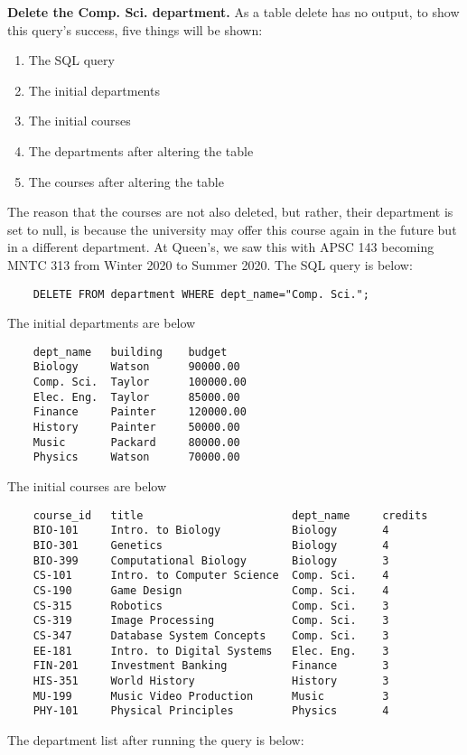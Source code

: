 \documentclass[letterpaper]{article}
\begin{document}
    \textbf{Delete the Comp. Sci. department.}
    As a table delete has no output, to show this query's success, five things will be shown:
    \begin{enumerate}
        \item The SQL query
        \item The initial departments
        \item The initial courses
        \item The departments after altering the table
        \item The courses after altering the table
    \end{enumerate}
    The reason that the courses are not also deleted, but rather, their department is set to null, is because the university may offer this course again in the future but in a different department. At Queen's, we saw this with APSC 143 becoming MNTC 313 from Winter 2020 to Summer 2020.
    The SQL query is below:
    \begin{lstlisting}
    DELETE FROM department WHERE dept_name="Comp. Sci.";
    \end{lstlisting}
    The initial departments are below
    \begin{lstlisting}
    dept_name	building	budget	
    Biology	    Watson	    90000.00
    Comp. Sci.	Taylor	    100000.00	
    Elec. Eng.	Taylor	    85000.00
    Finance	    Painter	    120000.00
    History	    Painter	    50000.00
    Music	    Packard	    80000.00
    Physics	    Watson	    70000.00
    \end{lstlisting}
    The initial courses are below
    \begin{lstlisting}
    course_id	title	                    dept_name	  credits	
    BIO-101	    Intro. to Biology	        Biology	      4
    BIO-301	    Genetics	                Biology	      4
    BIO-399	    Computational Biology	    Biology       3
    CS-101	    Intro. to Computer Science	Comp. Sci.	  4
    CS-190	    Game Design	                Comp. Sci.    4
    CS-315	    Robotics	                Comp. Sci.    3
    CS-319	    Image Processing	        Comp. Sci.    3
    CS-347	    Database System Concepts	Comp. Sci.    3
    EE-181	    Intro. to Digital Systems	Elec. Eng.    3
    FIN-201	    Investment Banking	        Finance	      3
    HIS-351	    World History	            History	      3
    MU-199	    Music Video Production	    Music	      3
    PHY-101	    Physical Principles	        Physics	      4
    \end{lstlisting}
    The department list after running the query is below:
\end{document}
